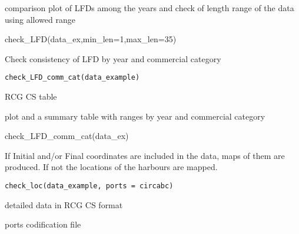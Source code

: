 \documentclass[a4paper]{book}
\begin{document}
%
\begin{Value}
comparison plot of LFDs among the  years and check of length range of the data using allowed range
\end{Value}
%
\begin{Examples}
\begin{ExampleCode}
check_LFD(data_ex,min_len=1,max_len=35)
\end{ExampleCode}
\end{Examples}
%
\begin{Description}\relax
Check consistency of LFD by year and commercial category
\end{Description}
%
\begin{Usage}
\begin{verbatim}
check_LFD_comm_cat(data_example)
\end{verbatim}
\end{Usage}
%
\begin{Arguments}
\begin{ldescription}
\item[\code{data\_example}] RCG CS table
\end{ldescription}
\end{Arguments}
%
\begin{Value}
plot and a summary table with ranges by year and commercial category
\end{Value}
%
\begin{Examples}
\begin{ExampleCode}
check_LFD_comm_cat(data_ex)
\end{ExampleCode}
\end{Examples}
%
\begin{Description}\relax
If Initial and/or Final coordinates are included in the data, maps of them are produced. If not the locations of the harbours are mapped.
\end{Description}
%
\begin{Usage}
\begin{verbatim}
check_loc(data_example, ports = circabc)
\end{verbatim}
\end{Usage}
%
\begin{Arguments}
\begin{ldescription}
\item[\code{data\_example}] detailed data in RCG CS format

\item[\code{ports}] ports codification file
\end{ldescription}
\end{Arguments}
\end{document}
